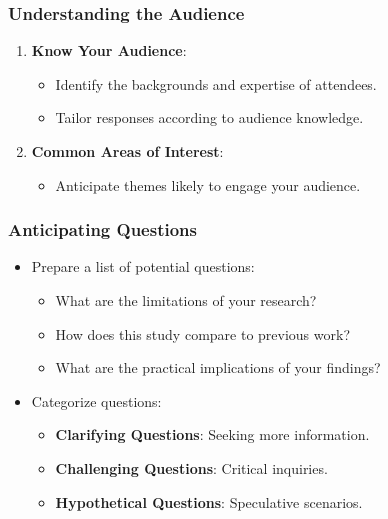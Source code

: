 \documentclass[aspectratio=169]{beamer}
\begin{document}
\begin{frame}[fragile]
    \frametitle{Understanding the Audience}
    \begin{enumerate}
        \item \textbf{Know Your Audience}: 
        \begin{itemize}
            \item Identify the backgrounds and expertise of attendees.
            \item Tailor responses according to audience knowledge.
        \end{itemize}
        \item \textbf{Common Areas of Interest}:
        \begin{itemize}
            \item Anticipate themes likely to engage your audience.
        \end{itemize}
    \end{enumerate}
\end{frame}

\begin{frame}[fragile]
    \frametitle{Anticipating Questions}
    \begin{itemize}
        \item Prepare a list of potential questions:
        \begin{itemize}
            \item What are the limitations of your research?
            \item How does this study compare to previous work?
            \item What are the practical implications of your findings?
        \end{itemize}
        \item Categorize questions:
        \begin{itemize}
            \item \textbf{Clarifying Questions}: Seeking more information.
            \item \textbf{Challenging Questions}: Critical inquiries.
            \item \textbf{Hypothetical Questions}: Speculative scenarios.
        \end{itemize}
    \end{itemize}
\end{frame}
\end{document}
